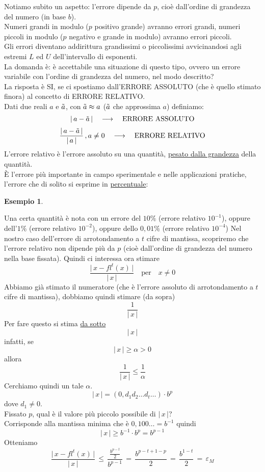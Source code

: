 \documentclass[12pt]{article}
\newtheorem*{esempio}{Esempio}
\begin{document}
Notiamo subito un aspetto: l'errore dipende da $p$, cioè dall'ordine di grandezza del numero (in base $b$).\\
Numeri grandi in modulo ($p$ positivo grande) avranno errori grandi, numeri piccoli in modulo ($p$ negativo e grande in modulo) avranno errori piccoli. \\
Gli errori diventano addirittura grandissimi o piccolissimi avvicinandosi agli estremi $L$ ed $U$ dell'intervallo di esponenti. \\
La domanda è: è accettabile una situazione di questo tipo, ovvero un errore variabile con l'ordine di grandezza del numero, nel modo descritto? \\
La risposta è SI, se ci spostiamo dall'ERRORE ASSOLUTO (che è quello stimato finora) al concetto di ERRORE RELATIVO. \\
Dati due reali $a$ e $\Tilde{a}$, con $\Tilde{a} \approx a$ ($\Tilde{a}$ che approssima $a$) definiamo:
\[ \lvert \, a - \Tilde{a} \, \rvert \quad \longrightarrow \quad \text{ERRORE ASSOLUTO}\]
\[ \frac{\lvert \, a - \Tilde{a} \, \rvert}{\lvert \, a \, \rvert} \, , a \ne 0 \quad \longrightarrow \quad \text{ERRORE RELATIVO} \]
L'errore relativo è l'errore assoluto su una quantità, \underline{pesato dalla grandezza} della quantità. \\
È l'errore più importante in campo sperimentale e nelle applicazioni pratiche, l'errore che di solito si esprime in \underline{percentuale}:
\begin{esempio} \end{esempio}
Una certa quantità è nota con un errore del $10\%$ (errore relativo $10^{-1}$), oppure dell'$1\%$ (errore relativo $10^{-2}$), oppure dello $0,01\%$ (errore relativo $10^{-4}$)
\newline \newline
Nel nostro caso dell'errore di arrotondamento a $t$ cifre di mantissa, scopriremo che l'errore relativo non dipende più da $p$ (cioè dall'ordine di grandezza del numero nella base fissata). Quindi ci interessa ora stimare
\[ \frac{\lvert \, x - fl^t(x) \, \rvert}{\lvert \, x \, \rvert} \quad \text{per}\quad x \ne 0 \]
Abbiamo già stimato il numeratore (che è l'errore assoluto di arrotondamento a $t$ cifre di mantissa), dobbiamo quindi stimare (da sopra) \[ \frac{1}{\lvert \, x  \, \rvert} \]
Per fare questo si stima \underline{da sotto} \[ \lvert \, x \, \rvert \]
infatti, se \[ \lvert \, x \, \rvert \ge \alpha > 0 \] allora 
\[ \frac{1}{\lvert \, x \, \rvert} \le \frac{1}{\alpha} \]
Cerchiamo quindi un tale $\alpha$.
\[ \lvert \, x \, \rvert = (0,d_1 d_2 \dotsc d_t \dotsc ) \cdot b^p \] dove $d_1 \ne 0$. \\
Fissato $p$, qual è il valore più piccolo possibile di $\lvert \, x \, \rvert$? \\
Corrisponde alla mantissa minima che è $0,100 \dotsc = b^{-1}$ quindi
\[ \lvert \, x \, \rvert \ge b^{-1} \cdot b^p = b^{p-1} \] Otteniamo
\[ \frac{\lvert \, x - fl^t(x) \, \rvert}{\lvert \, x \, \rvert} \, \le \, \frac{\frac{b^{p-t}}{2}}{b^{p-1}} \,=\, \frac{b^{p-t+1-p}}{2} \,=\, \frac{b^{1-t}}{2} \,=\, \varepsilon_M\]
\end{document}
